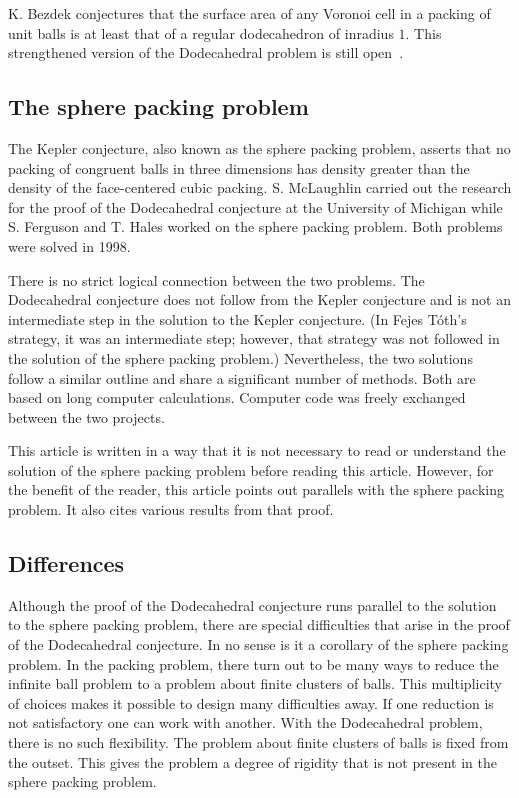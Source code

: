 \documentclass{article} %
\begin{document}
K. Bezdek conjectures that the surface area of any Voronoi cell in a packing
of unit balls is at least that of a regular dodecahedron of inradius $1$.
This strengthened version of the Dodecahedral problem is still
open~\cite{Bezdek:2004:WSP}.

\subsection{The sphere packing problem}

The Kepler conjecture, also known as the sphere packing problem,
asserts that no packing of congruent balls in three dimensions has
density greater than the density of the face-centered cubic packing.
S. McLaughlin carried out the research for the proof of the
Dodecahedral conjecture at the University of Michigan
while S. Ferguson and T. Hales worked on the sphere packing problem.
Both problems were solved in 1998.

There is no strict logical connection between the two problems. The
Dodecahedral conjecture does not follow from the Kepler conjecture and
is not an intermediate step in the solution to the Kepler conjecture.
(In Fejes T\'oth's strategy, it was an intermediate step; however,
that strategy was not followed in the solution of the sphere packing
problem.) Nevertheless, the two solutions follow a similar outline and
share a significant number of methods. Both are based on long computer
calculations. Computer code was freely exchanged between the two
projects.

This article is written in a way that it is not necessary to read or
understand the solution of the sphere packing problem before reading
this article. However, for the benefit of the reader, this article
points out parallels with the sphere packing problem. It also cites
various results from that proof.

\subsection{Differences}

Although the proof of the Dodecahedral conjecture runs parallel to the
solution to the sphere packing problem, there are special difficulties
that arise in the proof of the Dodecahedral conjecture. In no sense is
it a corollary of the sphere packing problem. In the packing problem,
there turn out to be many ways to reduce the infinite ball problem to
a problem about finite clusters of balls. This multiplicity of choices
makes it possible to design many difficulties away. If one reduction
is not satisfactory one can work with another. With the Dodecahedral
problem, there is no such flexibility. The problem about finite
clusters of balls is fixed from the outset. This gives the problem a
degree of rigidity that is not present in the sphere packing problem.
\end{document}
